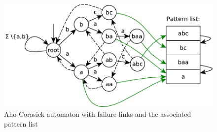 \documentclass[final]{beamer}
\begin{document}
\begin{poster}
%


%

\begin{figure}
\centering
 \includegraphics[width=25cm]{aho_corasick.pdf}
\caption{Aho-Corasick automaton with failure links and the associated pattern list}
\label{fig:ac_machine}
\end{figure}


\end{poster}
\end{document}
